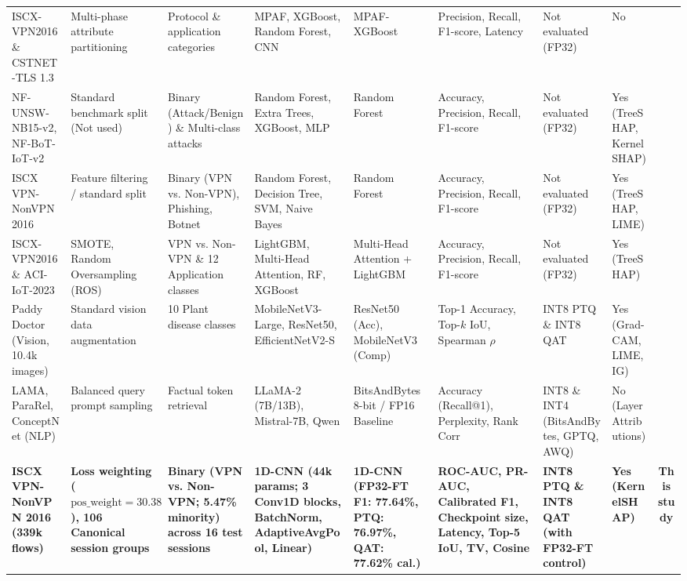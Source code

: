 \documentclass[conference]{IEEEtran}
\begin{document}
\begin{table}[htbp]
\begin{tabular}{p{2.2cm}p{2.0cm}p{2.1cm}p{2.4cm}p{2.0cm}p{2.2cm}p{1.9cm}p{1.4cm}c}
\addlinespace[2pt]
ISCX-VPN2016 \& CSTNET-TLS 1.3 & Multi-phase attribute partitioning & Protocol \& application categories & MPAF, XGBoost, Random Forest, CNN & MPAF-XGBoost & Precision, Recall, F1-score, Latency & Not evaluated (FP32) & No & \cite{b14} \\
\addlinespace[2pt]
NF-UNSW-NB15-v2, NF-BoT-IoT-v2 & Standard benchmark split (Not used) & Binary (Attack/Benign) \& Multi-class attacks & Random Forest, Extra Trees, XGBoost, MLP & Random Forest & Accuracy, Precision, Recall, F1-score & Not evaluated (FP32) & Yes (TreeSHAP, KernelSHAP) & \cite{b15} \\
\addlinespace[2pt]
ISCX VPN-NonVPN 2016 & Feature filtering / standard split & Binary (VPN vs. Non-VPN), Phishing, Botnet & Random Forest, Decision Tree, SVM, Naive Bayes & Random Forest & Accuracy, Precision, Recall, F1-score & Not evaluated (FP32) & Yes (TreeSHAP, LIME) & \cite{b16} \\
\addlinespace[2pt]
ISCX-VPN2016 \& ACI-IoT-2023 & SMOTE, Random Oversampling (ROS) & VPN vs. Non-VPN \& 12 Application classes & LightGBM, Multi-Head Attention, RF, XGBoost & Multi-Head Attention + LightGBM & Accuracy, Precision, Recall, F1-score & Not evaluated (FP32) & Yes (TreeSHAP) & \cite{b17} \\
\addlinespace[2pt]
Paddy Doctor (Vision, 10.4k images) & Standard vision data augmentation & 10 Plant disease classes & MobileNetV3-Large, ResNet50, EfficientNetV2-S & ResNet50 (Acc), MobileNetV3 (Comp) & Top-1 Accuracy, Top-$k$ IoU, Spearman $\rho$ & INT8 PTQ \& INT8 QAT & Yes (Grad-CAM, LIME, IG) & \cite{b18} \\
\addlinespace[2pt]
LAMA, ParaRel, ConceptNet (NLP) & Balanced query prompt sampling & Factual token retrieval & LLaMA-2 (7B/13B), Mistral-7B, Qwen & BitsAndBytes 8-bit / FP16 Baseline & Accuracy (Recall@1), Perplexity, Rank Corr & INT8 \& INT4 (BitsAndBytes, GPTQ, AWQ) & No (Layer Attributions) & \cite{b19} \\
\addlinespace[2pt]
\textbf{ISCX VPN-NonVPN 2016 (339k flows)} & \textbf{Loss weighting ($\text{pos\_weight} = 30.38$), 106 Canonical session groups} & \textbf{Binary (VPN vs. Non-VPN; 5.47\% minority) across 16 test sessions} & \textbf{1D-CNN (44k params; 3 Conv1D blocks, BatchNorm, AdaptiveAvgPool, Linear)} & \textbf{1D-CNN (FP32-FT F1: 77.64\%, PTQ: 76.97\%, QAT: 77.62\% cal.)} & \textbf{ROC-AUC, PR-AUC, Calibrated F1, Checkpoint size, Latency, Top-5 IoU, TV, Cosine} & \textbf{INT8 PTQ \& INT8 QAT (with FP32-FT control)} & \textbf{Yes (KernelSHAP)} & \textbf{This study} \\
\bottomrule
\end{tabular}
\end{table}
\end{document}
